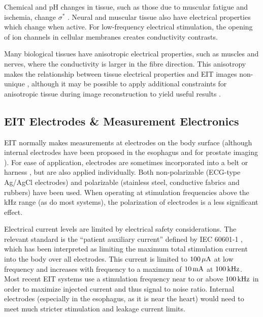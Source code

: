 \documentclass[10pt,journal]{IEEEtran}\def\TBLWIDA{15mm}\def\TBLWIDB{60mm}
\begin{document}
Chemical and pH changes in tissue, such as those due to
muscular fatigue and ischemia, change $\sigma^*$
\cite{Packham2012Frequency}.
Neural and muscular tissue also have electrical properties
which change when active.
For low-frequency electrical stimulation, the opening of
ion channels in cellular membranes \cite{Aristovich2014Neural}
creates conductivity contrasts. 

Many biological tissues have anisotropic electrical properties,
such as muscles and nerves, where the conductivity
is larger in the fibre direction.
This anisotropy makes the relationship between
tissue electrical properties and EIT images
non-unique \cite{Lee1989Anisotopic}, although
it may be possible to apply additional constraints for
anisotropic tissue
during image reconstruction to yield useful results
 \cite{Lionheart2010Finite}.

\subsection{EIT Electrodes \& Measurement Electronics}


EIT normally makes measurements at electrodes on the body surface 
(although internal electrodes have been proposed in the
esophagus \cite{Schuessler1995Esophageal}
 and for prostate imaging \cite{Borsic2009Prostate}).
For ease of application, electrodes are sometimes incorporated into a belt or
harness \cite{Waldmann2017Interface}, but are also applied individually. 
Both non-polarizable (ECG-type Ag/AgCl electrodes) and 
         polarizable (stainless steel, conductive fabrics and rubbers)
have been used. When operating at stimulation frequencies above
the kHz range (as do most systems), the polarization of electrodes is
a less significant effect.

Electrical current levels are limited by electrical safety considerations.
The relevant standard is the ``patient auxiliary current''
defined by IEC 60601-1 \cite{IEC60601}, which has been interpreted
as limiting the maximum total stimulation current into the body over all
electrodes. 
This current is limited to $\rm 100\,\mu A$ at low frequency
and increases with frequency to a maximum of $\rm 10\,mA$ at $\rm 100\,kHz$.
Most recent EIT systems use a stimulation frequency 
near to or above $\rm 100\,kHz$ in order to maximize
injected current and thus signal to noise ratio.
Internal electrodes \cite{Schuessler1995Esophageal}
(especially in the esophagus, as it is near the heart)
would need to meet much stricter stimulation and leakage current limits.
\end{document}
